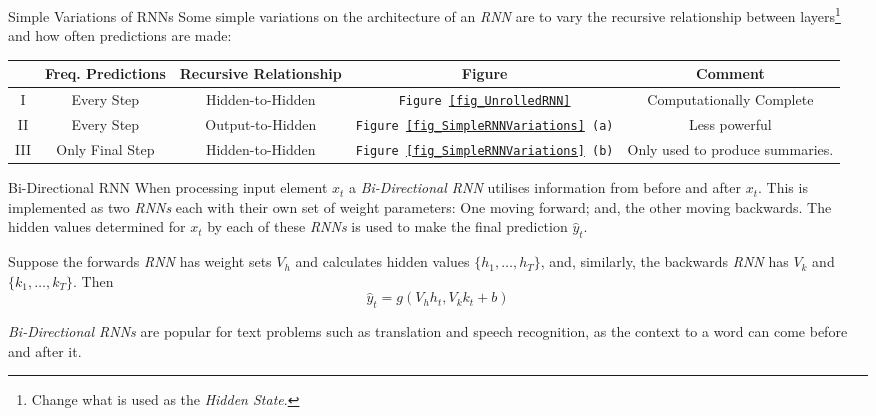 \documentclass[11pt,a4paper]{article}
\begin{document}
  \begin{proposition}{Simple Variations of RNNs}
    Some simple variations on the architecture of an \textit{RNN} are to vary the recursive relationship between layers\footnote{Change what is used as the \textit{Hidden State}.} and how often predictions are made:
    \begin{adjustwidth}{-1cm}{}
      \begin{center}
        \begin{tabular}{|c|c|c|c|c|}
          \hline
          &\textbf{Freq. Predictions}&\textbf{Recursive Relationship}&\textbf{Figure}&\textbf{Comment}\\\hline
          I&Every Step&Hidden-to-Hidden&\texttt{Figure \ref{fig_UnrolledRNN}}&Computationally Complete\\
          II&Every Step&Output-to-Hidden&\texttt{Figure \ref{fig_SimpleRNNVariations} (a)}&Less powerful\\
          III&Only Final Step&Hidden-to-Hidden&\texttt{Figure \ref{fig_SimpleRNNVariations} (b)}&Only used to produce summaries.\\\hline
        \end{tabular}
      \end{center}
    \end{adjustwidth}
  \end{proposition}

  \begin{proposition}{Bi-Directional RNN}
    When processing input element $x_t$ a \textit{Bi-Directional RNN} utilises information from before and after $x_t$. This is implemented as two \textit{RNNs} each with their own set of weight parameters: One moving forward; and, the other moving backwards. The hidden values determined for $x_t$ by each of these \textit{RNNs} is used to make the final prediction $\hat{y}_t$.
    \par Suppose the forwards \textit{RNN} has weight sets $V_h$ and calculates hidden values $\{h_1,\dots,h_T\}$, and, similarly, the backwards \textit{RNN} has $V_k$ and $\{k_1,\dots,k_T\}$. Then
    \[ \hat{y}_t=g(V_hh_t,V_kk_t+b) \]
    \par \textit{Bi-Directional RNNs} are popular for text problems such as translation and speech recognition, as the context to a word can come before and after it.
  \end{proposition}
\end{document}
